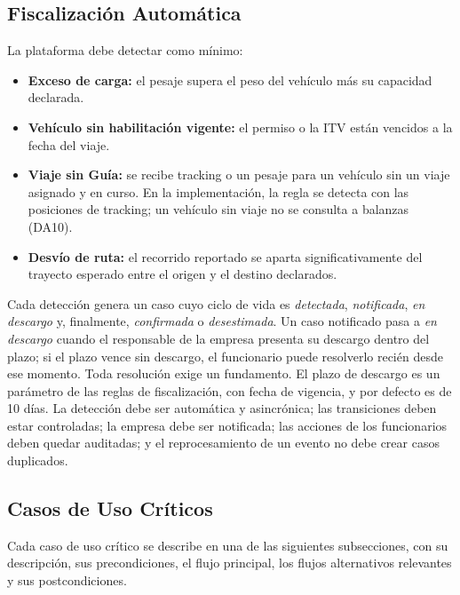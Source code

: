 \subsection{Fiscalización Automática}

La plataforma debe detectar como mínimo:

\begin{itemize}
    \item \textbf{Exceso de carga:} el pesaje supera el peso del vehículo más su capacidad declarada.
    \item \textbf{Vehículo sin habilitación vigente:} el permiso o la ITV están vencidos a la fecha del viaje.
    \item \textbf{Viaje sin Guía:} se recibe tracking o un pesaje para un vehículo sin un viaje asignado y en curso. En la implementación, la regla se detecta con las posiciones de tracking; un vehículo sin viaje no se consulta a balanzas (DA10).
    \item \textbf{Desvío de ruta:} el recorrido reportado se aparta significativamente del trayecto esperado entre el origen y el destino declarados.
\end{itemize}

Cada detección genera un caso cuyo ciclo de vida es \emph{detectada}, \emph{notificada}, \emph{en descargo} y, finalmente, \emph{confirmada} o \emph{desestimada}. Un caso notificado pasa a \emph{en descargo} cuando el responsable de la empresa presenta su descargo dentro del plazo; si el plazo vence sin descargo, el funcionario puede resolverlo recién desde ese momento. Toda resolución exige un fundamento. El plazo de descargo es un parámetro de las reglas de fiscalización, con fecha de vigencia, y por defecto es de 10 días. La detección debe ser automática y asincrónica; las transiciones deben estar controladas; la empresa debe ser notificada; las acciones de los funcionarios deben quedar auditadas; y el reprocesamiento de un evento no debe crear casos duplicados.

\FloatBarrier

\subsection{Casos de Uso Críticos}

Cada caso de uso crítico se describe en una de las siguientes subsecciones, con su descripción, sus precondiciones, el flujo principal, los flujos alternativos relevantes y sus postcondiciones.

